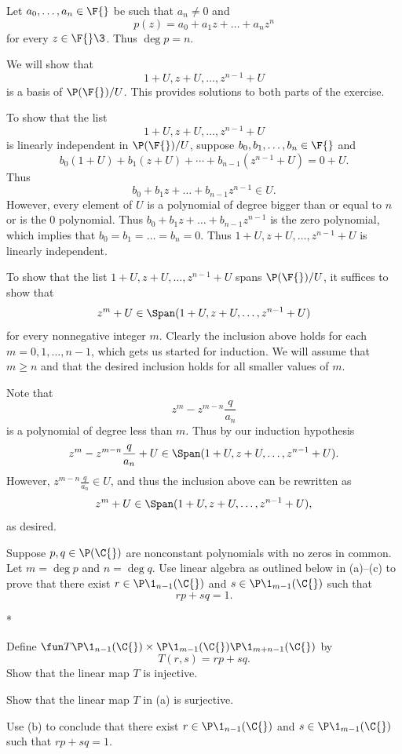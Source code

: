 \begin{Solution}
Let $a_0, \dots, a_n \in \F{}$ be such that $a_n \ne 0$ and
\[
p(z) = a_0 + a_1 z + \dots + a_n z^n
\]
for every $z \in \F{}\3$. Thus $\deg p = n$.

We will show that
\[
1+ U, z + U, \dots, z^{n-1} + U
\]
is a basis of $\P(\F{})/U$. This provides solutions to both parts of the exercise.

To show that the list
\[
1+ U, z + U, \dots, z^{n-1} + U
\]
is linearly independent in $\P(\F{})/U$, suppose $b_0, b_1, \dots, b_n \in \F{}$ and
\[
b_0(1+ U) + b_1( z + U) + \cdots+ b_{n-1} (z^{n-1} + U) = 0 + U.
\]
Thus
\[
b_0 + b_1 z + \dots + b_{n-1} z^{n-1} \in U.
\]
However, every element of $U$ is a polynomial of degree bigger than or equal to $n$ or is the $0$ polynomial. Thus $b_0 + b_1 z + \dots + b_{n-1} z^{n-1}$ is the zero polynomial, which implies that
$b_0 = b_1 = \dots = b_n = 0$. Thus $1+ U, z + U, \dots, z^{n-1} + U$ is linearly independent.

To show that the list $1+ U, z + U, \dots, z^{n-1} + U$ spans $\P(\F{})/U$, it suffices to show that
\[
z^m + U \in \Span( 1+ U, z + U, \dots, z^{n-1} + U )
\]
for every nonnegative integer $m$. Clearly the inclusion above holds for each $m = 0, 1, \dots, n-1$, which gets us started for induction. We will assume that $m \ge n$ and that the desired inclusion holds for all smaller values of $m$.

Note that
\[
z^m - z^{m-n} \frac{q}{a_n}
\]
is a polynomial of degree less than $m$. Thus by our induction hypothesis
\[
z^m - z^{m-n} \frac{q}{a_n} + U \in \Span( 1+ U, z + U, \dots, z^{n-1} + U ).
\]
However, $z^{m-n} \frac{q}{a_n} \in U$, and thus the inclusion above can be rewritten as
\[
z^m  + U \in \Span( 1+ U, z + U, \dots, z^{n-1} + U ),
\]
as desired.
\end{Solution}

\exercise
Suppose $p, q \in \P(\C{})$ are nonconstant polynomials with no zeros in common. Let $m = \deg p$ and $n = \deg q$. Use linear algebra as outlined below in (a)--(c) to prove that there exist
$r \in \P\1_{n-1}(\C{})$ and $s \in \P\1_{m-1}(\C{})$ such that
\[
rp + sq = 1.
\]
\begin{subtheorem}*
\item
Define $\fun T { \P\1_{n-1}(\C{}) \times \P\1_{m-1}(\C{}) } {\P\1_{m+n-1}(\C{})}$ by
\[
T(r, s) = rp + sq.
\]
Show that the linear map $T$ is injective.
\item
Show that the linear map $T$ in (a) is surjective.
\item
Use (b) to conclude that there exist $r \in \P\1_{n-1}(\C{})$ and $s \in \P\1_{m-1}(\C{})$ such that $rp + sq = 1$.
\end{subtheorem}
\exercisesubtheoremend

